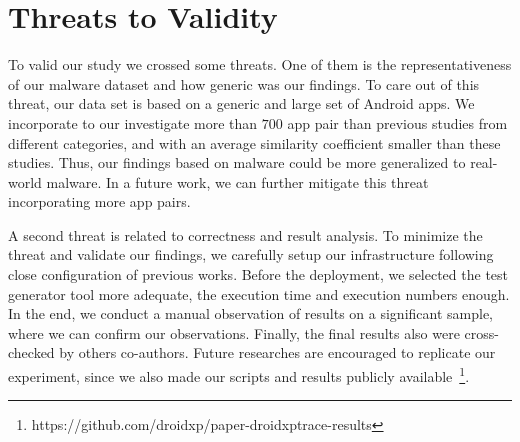 \section{Threats to Validity}\label{sec:threats}

To valid our study we crossed some threats. One of them is the representativeness of our malware dataset and how generic was our findings. To care out of this threat, our data set is based on a generic and large set of Android apps. We incorporate to our investigate more than $700$ app pair than previous studies from different categories, and with an average similarity coefficient smaller than these studies. Thus, our findings based on malware could be more generalized to real-world malware. In a future work, we can further mitigate this threat incorporating more app pairs. 

A second threat is related to correctness and result analysis. To minimize the threat and validate our findings, we carefully setup our infrastructure following close configuration of previous works. Before the deployment, we selected the test generator tool more adequate, the execution time and execution numbers enough. In the end, we conduct a manual observation of results on a significant sample, where we can confirm our observations. Finally, the final results also were cross-checked by others co-authors. Future researches are encouraged to replicate our experiment, since we also made our scripts and results publicly available~\footnote{ https://github.com/droidxp/paper-droidxptrace-results}.